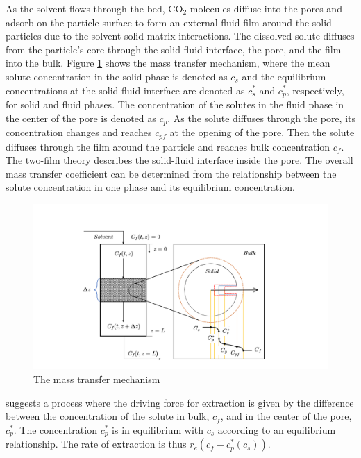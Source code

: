 \documentclass[../Article_Model_Parameters.tex]{subfiles}
\begin{document}
	As the solvent flows through the bed, CO$_2$ molecules diffuse into the pores and adsorb on the particle surface to form an external fluid film around the solid particles due to the solvent-solid matrix interactions. The dissolved solute diffuses from the particle's core through the solid-fluid interface, the pore, and the film into the bulk. Figure \ref{fig: SFE_Mechanism} shows the mass transfer mechanism, where the mean solute concentration in the solid phase is denoted as $c_s$ and the equilibrium concentrations at the solid-fluid interface are denoted as $c_s^*$ and $c_p^*$, respectively, for solid and fluid phases. The concentration of the solutes in the fluid phase in the center of the pore is denoted as $c_p$. As the solute diffuses through the pore, its concentration changes and reaches $c_{pf}$ at the opening of the pore. Then the solute diffuses through the film around the particle and reaches bulk concentration $c_f$. The two-film theory describes the solid-fluid interface inside the pore. The overall mass transfer coefficient can be determined from the relationship between the solute concentration in one phase and its equilibrium concentration.
			
		\begin{figure}[h!]
			\centering
			\includegraphics[trim = 45cm 0cm 60cm 20cm,clip,width=0.85\columnwidth]{Figures/SFE_PFD.drawio.png}	
			\caption{The mass transfer mechanism}
			\label{fig: SFE_Mechanism}
		\end{figure}
			
		\citet{Bulley1984} suggests a process where the driving force for extraction is given by the difference between the concentration of the solute in bulk, $c_f$, and in the center of the pore, $c_p^*$. The concentration $c_p^*$ is in equilibrium with $c_s$ according to an equilibrium relationship. The rate of extraction is thus $r_e\left(c_f - c^*_p(c_s)\right)$.  
			
\end{document}
